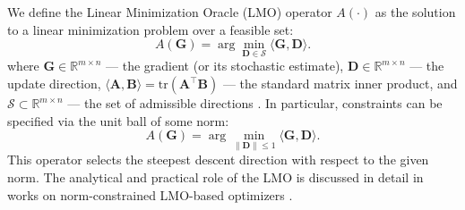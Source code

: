 \documentclass{article}
\begin{document}
We define the Linear Minimization Oracle (LMO) operator $A(\cdot)$ as the solution to a linear minimization problem over a feasible set:
\begin{equation}
A(\mathbf{G})=\arg\min_{\mathbf{D} \in \mathcal{S}}\langle \mathbf{G}, \mathbf{D}\rangle.
\end{equation}
where  $\mathbf{G}\in\mathbb{R}^{m\times n}$ — the gradient (or its stochastic estimate), $\mathbf{D}\in\mathbb{R}^{m\times n}$ — the update direction, $\langle \mathbf{A},\mathbf{B}\rangle=\mathrm{tr}(\mathbf{A}^\top\mathbf{B})$ — the standard matrix inner product, and $\mathcal{S}\subset\mathbb{R}^{m\times n}$ — the set of admissible directions \cite{kravatskiy2025kyfan}. In particular, constraints can be specified via the unit ball of some norm:
\begin{equation}
A(\mathbf{G})=\arg\min_{\|\mathbf{D}\|\le 1}\langle \mathbf{G},\mathbf{D}\rangle.
\end{equation}
This operator selects the steepest descent direction with respect to the given norm. The analytical and practical role of the LMO is discussed in detail in works on norm-constrained LMO-based optimizers \cite{bernstein2025normconstrained, kovalev2025orthogonalization}.
\end{document}
